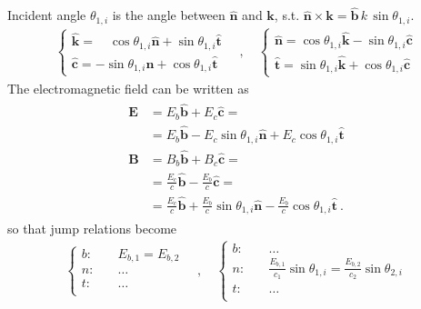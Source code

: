 \documentclass[letterpaper,10pt,english]{jupyterBook}
\begin{document}
\sphinxAtStartPar
Incident angle \(\theta_{1,i}\) is the angle between \(\hat{\mathbf{n}}\) and \(\mathbf{k}\), s.t. \(\hat{\mathbf{n}} \times \mathbf{k} = \hat{\mathbf{b}} \, k \, \sin \theta_{1,i}\).
\begin{equation*}
\begin{split}\begin{cases}
  \hat{\mathbf{k}} = \quad \cos \theta_{1,i} \hat{\mathbf{n}} + \sin \theta_{1,i} \hat{\mathbf{t}} \\
  \hat{\mathbf{c}} =      -\sin \theta_{1,i} \hat{\mathbf{n}} + \cos \theta_{1,i} \hat{\mathbf{t}}
\end{cases}
\quad , \quad
\begin{cases}
  \hat{\mathbf{n}} = \cos \theta_{1,i} \hat{\mathbf{k}} - \sin \theta_{1,i} \hat{\mathbf{c}} \\
  \hat{\mathbf{t}} = \sin \theta_{1,i} \hat{\mathbf{k}} + \cos \theta_{1,i} \hat{\mathbf{c}}
\end{cases}\end{split}
\end{equation*}
\sphinxAtStartPar
The electromagnetic field can be written as
\begin{equation*}
\begin{split}\begin{aligned}
  \mathbf{E} & = E_b \hat{\mathbf{b}} + E_c \hat{\mathbf{c}} = \\
             & = E_b \hat{\mathbf{b}} - E_c \sin \theta_{1,i} \hat{\mathbf{n}} + E_c \cos \theta_{1,i} \hat{\mathbf{t}} \\
  \mathbf{B} & = B_b \hat{\mathbf{b}} + B_c \hat{\mathbf{c}} = \\
             & = \frac{E_c}{c} \hat{\mathbf{b}} - \frac{E_b}{c} \hat{\mathbf{c}} = \\
             & = \frac{E_c}{c} \hat{\mathbf{b}} + \frac{E_b}{c} \sin \theta_{1,i} \hat{\mathbf{n}} - \frac{E_b}{c} \cos \theta_{1,i} \hat{\mathbf{t}} \ .
\end{aligned}\end{split}
\end{equation*}
\sphinxAtStartPar
so that jump relations become
\begin{equation*}
\begin{split}\begin{cases}
  b: & \quad E_{b,1} = E_{b,2} \\
  n: & \quad \dots \\
  t: & \quad \dots \\
\end{cases}
\quad , \quad
\begin{cases}
  b: & \quad \dots \\
  n: & \quad \frac{E_{b,1}}{c_1} \sin \theta_{1,i} = \frac{E_{b,2}}{c_2} \sin \theta_{2,i}  \\
  t: & \quad \dots \\
\end{cases}\end{split}
\end{equation*}
\end{document}
